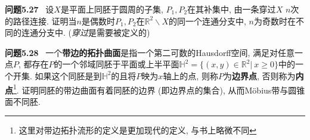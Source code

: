 \documentclass[11pt]{article}
\theoremstyle{definition}\newtheorem*{analyse}{分析}
\theoremstyle{remark}\newtheorem{rem*}{评注}
\newenvironment{env}[1]{\par\vspace{1em}\noindent\textbf{#1}\ }{\par\vspace{1em}}
\begin{document}
\begin{env}{问题5.27}
    设$X$是平面上同胚于圆周的子集, $P_1,P_2$在其补集中, 由一条穿过$X$ $n$次的路径连接.
    证明当$n$是偶数时$P_1,P_2$在$\mathbb{R}^2\backslash X$的同一个连通分支中, $n$为奇数时在不同的连通分支中.
    (\textit{穿过}是需要被定义的)
\end{env}

\begin{env}{问题5.28}
    一个\textbf{带边的拓扑曲面}是指一个第二可数的Hausdorff空间, 满足对任意一点$P$, 都存在$P$的一个邻域同胚于平面或上半平面$\mathbb{H}^2=\{(x,y)\in\mathbb{R}^2|\ x\geq 0\}$中的一个开集.
    如果这个同胚是到$\mathbb{H}^2$的且将$P$映为$x$轴上的点, 则称$P$为\textbf{边界点}, 否则称为\textbf{内点}\footnote{这里对带边拓扑流形的定义是更加现代的定义, 与书上略微不同}.
    证明同胚的带边曲面有着同胚的边界 (即边界点的集合), 从而M\"{o}bius带与圆锥面不同胚.
\end{env}

\printbibliography[title={参考文献}]
\end{document}
